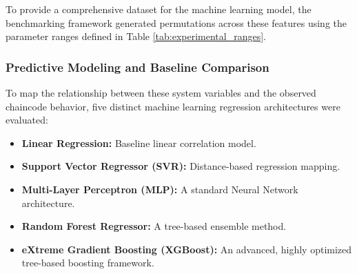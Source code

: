 \documentclass[manuscript,screen,nofonts]{acmart}
\begin{document}
To provide a comprehensive dataset for the machine learning model, the benchmarking framework generated permutations across these features using the parameter ranges defined in Table \ref{tab:experimental_ranges}.

\begin{table}[ht]
\centering
\caption{Experimental Benchmarking Parameter Ranges}
\label{tab:experimental_ranges}
\end{table}

\subsubsection{Predictive Modeling and Baseline Comparison}

To map the relationship between these system variables and the observed chaincode behavior, five distinct machine learning regression architectures were evaluated:
\begin{itemize}
    \item \textbf{Linear Regression:} Baseline linear correlation model.
    \item \textbf{Support Vector Regressor (SVR):} Distance-based regression mapping.
    \item \textbf{Multi-Layer Perceptron (MLP):} A standard Neural Network architecture.
    \item \textbf{Random Forest Regressor:} A tree-based ensemble method.
    \item \textbf{eXtreme Gradient Boosting (XGBoost):} An advanced, highly optimized tree-based boosting framework.
\end{itemize}
\end{document}

